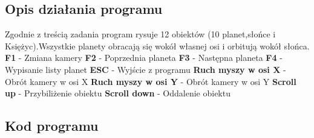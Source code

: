 \documentclass{article}
\begin{document}
        \subsection{Opis działania programu}
            Zgodnie z treścią zadania program rysuje 12 obiektów (10 planet,słońce i Księżyc).Wszystkie
            planety obracają się wokół własnej osi i orbitują wokół słońca.
            \textbf{F1} - Zmiana kamery\linebreak
            \textbf{F2} - Poprzednia planeta\linebreak
            \textbf{F3} - Następna planeta\linebreak
            \textbf{F4} - Wypisanie listy planet\linebreak
            \textbf{ESC} - Wyjście z programu\linebreak 
            \textbf{Ruch myszy w osi X} - Obrót kamery w osi X\linebreak 
            \textbf{Ruch myszy w osi Y} - Obrót kamery w osi Y\linebreak 
            \textbf{Scroll up} - Przybiliżenie obiektu\linebreak 
            \textbf{Scroll down} - Oddalenie obiektu\linebreak 
        \subsection{Kod programu}
\end{document}
